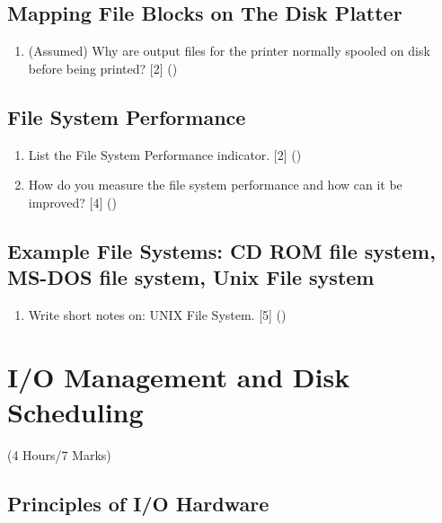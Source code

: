 \documentclass[12pt]{article}
\begin{document}
	\subsection{Mapping File Blocks on The Disk Platter}
		\begin{enumerate}
			\item (Assumed) Why are output files for the printer normally spooled on disk before being printed? \hfill [2] ()
		\end{enumerate}
		
	\subsection{File System Performance}
		\begin{enumerate}
			\item List the File System Performance indicator. \hfill [2] ()

			\item How do you measure the file system performance and how can it be improved? \hfill [4] ()
		\end{enumerate}

	\subsection{Example File Systems: CD ROM file system, MS-DOS file system, Unix File system}
		\begin{enumerate}
			\item Write short notes on: UNIX File System. \hfill [5] ()
		\end{enumerate}

	\pagebreak

\section{I/O Management and Disk Scheduling}
	\begin{center}(4 Hours/7 Marks)\end{center}
	\subsection{Principles of I/O Hardware}
\end{document}

